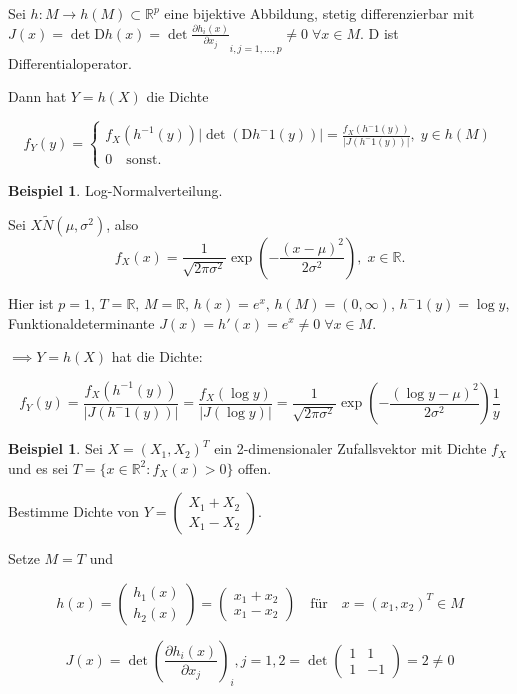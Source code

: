 \documentclass[12pt, a4paper]{article}
\theoremstyle{plain}
\theoremstyle{definition}
\newtheorem{beispiel}[thm]{Beispiel}
\newcommand{\R}{\mathbb{R}}
\newcommand{\1}{\mathds{1}}
\providecommand{\abs}[1]{\lvert#1\rvert}
\providecommand{\mtext}[1]{\quad \text{#1} \quad}
\begin{document}
Sei $h: M \to h(M) \subset \R^p$ eine bijektive Abbildung, stetig differenzierbar mit $J(x) = \det{\mathrm{D}h(x)} = \det{\frac{\partial h_i (x)}{\partial x_j}}_{i,j = 1,\ldots,p} \neq 0 \; \forall x \in M$. $\mathrm{D}$ ist Differentialoperator.

Dann hat $Y = h(X)$ die Dichte

\[ f_Y (y) = \begin{cases} f_X (h^{-1} (y)) \abs{\det (\mathrm{D}h^-1 (y))} = \frac{f_X (h^-1 (y))}{\abs{J(h^-1(y))}}, \; y \in h(M)   \\ 0 \mtext{sonst.}    \end{cases}  \]


\begin{beispiel} Log-Normalverteilung. \end{beispiel}

Sei $X \tilde N(\mu, \sigma^2)$, also \[f_X (x) = \frac{1}{\sqrt{2\pi \sigma^2}} \exp{(-\frac{(x-\mu)^2}{2\sigma^2}), \; x \in \R}.\]

Hier ist $p=1,\, T = \R,\, M = \R,\, h(x)=e^x,\, h(M) = (0, \infty), \, h^-1(y) = \log y$, Funktionaldeterminante $J(x) = h'(x) = e^x \neq 0 \; \forall x \in M$.

\(   \implies Y = h(X)  \) hat die Dichte:

\[  f_Y (y) = \frac{ f_X (h^{-1}(y))}{\abs{J(h^-1 (y))}} = \frac{f_X (\log y)}{\abs{J(\log y)}}  = \frac{1}{\sqrt{2\pi\sigma^2}} \exp(-\frac{ (\log y - \mu)^2 }{2\sigma^2}) \frac{1}{y}    \]

\begin{beispiel} Sei $X = (X_1, X_2)^T$ ein 2-dimensionaler Zufallsvektor mit Dichte $f_X$ und es sei $T = \{ x\in\R^2 : f_X (x) > 0 \}$ offen. \end{beispiel}

Bestimme Dichte von $Y = \begin{pmatrix} X_1 + X_2 \\X_1 - X_2 \end{pmatrix}$.

Setze $M=T$ und 

\[ h(x) = \begin{pmatrix} h_1(x) \\ h_2 (x)   \end{pmatrix} = \begin{pmatrix} x_1 + x_2 \\ x_1 - x_2 \end{pmatrix} \mtext{für} x = (x_1, x_2)^T \in M \]

\[ J(x) = \det(  \frac{ \partial h_i (x) }{\partial x_j}    )_i,j = 1,2  = \det \begin{pmatrix} 1 & 1 \\ 1 & -1 \end{pmatrix}  = 2 \neq 0    \]
\end{document}
